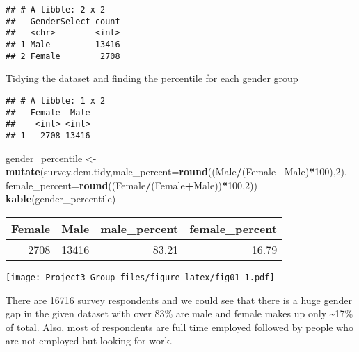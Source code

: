 \documentclass[]{article}
\newenvironment{Shaded}{\begin{snugshade}}{\end{snugshade}}
\newcommand{\DataTypeTok}[1]{\textcolor[rgb]{0.13,0.29,0.53}{#1}}
\newcommand{\DecValTok}[1]{\textcolor[rgb]{0.00,0.00,0.81}{#1}}
\newcommand{\KeywordTok}[1]{\textcolor[rgb]{0.13,0.29,0.53}{\textbf{#1}}}
\newcommand{\NormalTok}[1]{#1}
\newcommand{\OperatorTok}[1]{\textcolor[rgb]{0.81,0.36,0.00}{\textbf{#1}}}
\newcommand{\StringTok}[1]{\textcolor[rgb]{0.31,0.60,0.02}{#1}}
\begin{document}
\begin{verbatim}
## # A tibble: 2 x 2
##   GenderSelect count
##   <chr>        <int>
## 1 Male         13416
## 2 Female        2708
\end{verbatim}

Tidying the dataset and finding the percentile for each gender group

\begin{Shaded}
\end{Shaded}

\begin{verbatim}
## # A tibble: 1 x 2
##   Female  Male
##    <int> <int>
## 1   2708 13416
\end{verbatim}

\begin{Shaded}
\begin{Highlighting}[]
\NormalTok{gender_percentile <-}\StringTok{ }\KeywordTok{mutate}\NormalTok{(survey.dem.tidy,}\DataTypeTok{male_percent=}\KeywordTok{round}\NormalTok{((Male}\OperatorTok{/}\NormalTok{(Female}\OperatorTok{+}\NormalTok{Male)}\OperatorTok{*}\DecValTok{100}\NormalTok{),}\DecValTok{2}\NormalTok{),}
                            \DataTypeTok{female_percent=}\KeywordTok{round}\NormalTok{((Female}\OperatorTok{/}\NormalTok{(Female}\OperatorTok{+}\NormalTok{Male))}\OperatorTok{*}\DecValTok{100}\NormalTok{,}\DecValTok{2}\NormalTok{))}
\KeywordTok{kable}\NormalTok{(gender_percentile)}
\end{Highlighting}
\end{Shaded}

\begin{tabular}{r|r|r|r}
\hline
Female & Male & male\_percent & female\_percent\\
\hline
2708 & 13416 & 83.21 & 16.79\\
\hline
\end{tabular}

\texttt{[image: Project3\_Group\_files/figure-latex/fig01-1.pdf]}

There are 16716 survey respondents and we could see that there is a huge
gender gap in the given dataset with over 83\% are male and female makes
up only \textasciitilde{}17\% of total. Also, most of respondents are
full time employed followed by people who are not employed but looking
for work.
\end{document}
